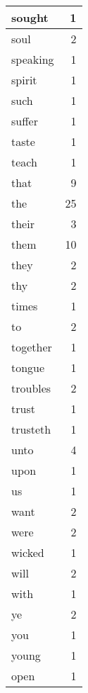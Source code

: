 \begin{center}
\begin{longtable}{l|r}
sought & 1 \\ \hline
soul & 2 \\ \hline
speaking & 1 \\ \hline
spirit & 1 \\ \hline
such & 1 \\ \hline
suffer & 1 \\ \hline
taste & 1 \\ \hline
teach & 1 \\ \hline
that & 9 \\ \hline
the & 25 \\ \hline
their & 3 \\ \hline
them & 10 \\ \hline
they & 2 \\ \hline
thy & 2 \\ \hline
times & 1 \\ \hline
to & 2 \\ \hline
together & 1 \\ \hline
tongue & 1 \\ \hline
troubles & 2 \\ \hline
trust & 1 \\ \hline
trusteth & 1 \\ \hline
unto & 4 \\ \hline
upon & 1 \\ \hline
us & 1 \\ \hline
want & 2 \\ \hline
were & 2 \\ \hline
wicked & 1 \\ \hline
will & 2 \\ \hline
with & 1 \\ \hline
ye & 2 \\ \hline
you & 1 \\ \hline
young & 1 \\ \hline
{open} & 1 \\ \hline
\end{longtable}
\end{center}



\normalsize



